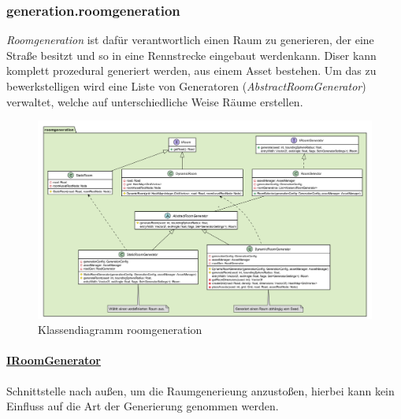 \subsubsection{generation.roomgeneration}
    \textit{Roomgeneration} ist dafür verantwortlich einen Raum zu generieren, der eine Straße besitzt und so 
    in eine Rennstrecke eingebaut werdenkann. Diser kann komplett prozedural generiert werden, aus einem Asset bestehen.
    Um das zu bewerkstelligen wird eine Liste von Generatoren (\textit{AbstractRoomGenerator}) verwaltet, welche
    auf unterschiedliche Weise Räume erstellen.\par

    \begin{figure}[htbp]
        \centering
        \includegraphics[width=\linewidth]{./Generierung/Bilder/roomgeneration.png}
        \caption{Klassendiagramm roomgeneration}
    \end{figure}

        \pagebreak
        \paragraph{\underline{IRoomGenerator}} \mbox{}\par
            Schnittstelle nach außen, um die Raumgenerieung anzustoßen, hierbei kann kein Einfluss auf die Art der Generierung 
            genommen werden.\par
            
